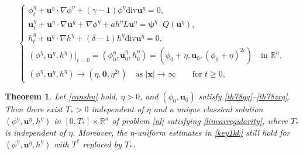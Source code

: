 \documentclass[10pt,a4paper]{amsart}
\newtheorem{thm}{Theorem}
\begin{document}
\begin{equation}\label{nl}
\begin{cases}
\phi^{\eta}_t+\boldsymbol{u}^{\eta}\cdot\nabla\phi^{\eta}+(\gamma-1)\phi^{\eta} \mathrm{div}\boldsymbol{u}^{\eta}=0,\\[2pt]
\displaystyle\boldsymbol{u}^{\eta}_t+\boldsymbol{u}^{\eta}\cdot \nabla \boldsymbol{u}^{\eta}+\nabla\phi^{\eta}+a h^{\eta} L\boldsymbol{u}^{\eta}= \boldsymbol{\psi}^{\eta} \cdot Q(\boldsymbol{u}^{\eta}),\\[3pt]
h^{\eta}_t+\boldsymbol{u}^\eta\cdot\nabla h^\eta+(\delta-1) h^\eta \mathrm{div} \boldsymbol{u}^{\eta}=0,\\[3pt]
(\phi^{\eta},\boldsymbol{u}^{\eta},h^{\eta})|_{t=0}=(\phi^\eta_0,\boldsymbol{u}^\eta_0,h_0^\eta)
=(\phi_0+\eta,\boldsymbol{u}_0,(\phi_0+\eta)^{2\iota})\quad \text{in $\mathbb{R}^n$},\\[3pt]
(\phi^{\eta},\boldsymbol{u}^{\eta},h^{\eta})\to (\eta,\boldsymbol{0},\eta^{2\iota}) \quad \text{as $|\boldsymbol{x}|\to \infty$} \qquad \text{for $t\geq 0$},
\end{cases}
\end{equation}

\begin{thm}\label{nltm}
Let \eqref{canshu} hold, $\eta>0$, and  $(\phi_0,\boldsymbol{u}_0)$ satisfy \eqref{th78qq}--\eqref{th78zxq}. Then there exist $T_*>0$ independent of $\eta$ and a unique classical solution 
$(\phi^\eta, \boldsymbol{u}^\eta, h^\eta)$ in $[0,T_*]\times\mathbb{R}^n$ of problem \eqref{nl} satisfying \eqref{linearregularity}, where $T_*$ is independent of $\eta$. Moreover, the $\eta$-uniform estimates in \eqref{key1kk} still hold for $(\phi^\eta,\boldsymbol{u}^\eta,h^\eta)$ with $T^*$ replaced by $T_*$. 
\end{thm}
\end{document}
